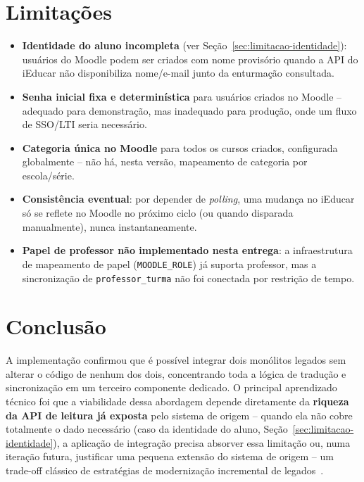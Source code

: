 \documentclass[
	12pt, openright, twoside, a4paper,
	english,
	brazil
	]{abntex2}
\begin{document}
\chapter{Limita\c{c}\~oes}
\label{cap:limitacoes}

\begin{itemize}
  \item \textbf{Identidade do aluno incompleta} (ver Se\c{c}\~ao~\ref{sec:limitacao-identidade}):
  usu\'arios do Moodle podem ser criados com nome provis\'orio quando a API do iEducar n\~ao
  disponibiliza nome/e-mail junto da enturma\c{c}\~ao consultada.
  \item \textbf{Senha inicial fixa e determin\'istica} para usu\'arios criados no Moodle -- adequado
  para demonstra\c{c}\~ao, mas inadequado para produ\c{c}\~ao, onde um fluxo de SSO/LTI seria
  necess\'ario.
  \item \textbf{Categoria \'unica no Moodle} para todos os cursos criados, configurada globalmente
  -- n\~ao h\'a, nesta vers\~ao, mapeamento de categoria por escola/s\'erie.
  \item \textbf{Consist\^encia eventual}: por depender de \emph{polling}, uma mudan\c{c}a no
  iEducar só se reflete no Moodle no pr\'oximo ciclo (ou quando disparada manualmente), nunca
  instantaneamente.
  \item \textbf{Papel de professor n\~ao implementado nesta entrega}: a infraestrutura de
  mapeamento de papel (\texttt{MOODLE\_ROLE}) j\'a suporta professor, mas a sincroniza\c{c}\~ao de
  \texttt{professor\_turma} n\~ao foi conectada por restri\c{c}\~ao de tempo.
\end{itemize}

\chapter*{Conclus\~ao}

A implementa\c{c}\~ao confirmou que \'e poss\'ivel integrar dois monólitos legados sem alterar o
c\'odigo de nenhum dos dois, concentrando toda a l\'ogica de tradu\c{c}\~ao e sincroniza\c{c}\~ao
em um terceiro componente dedicado. O principal aprendizado t\'ecnico foi que a viabilidade dessa
abordagem depende diretamente da \textbf{riqueza da API de leitura j\'a exposta} pelo sistema de
origem -- quando ela n\~ao cobre totalmente o dado necess\'ario (caso da identidade do aluno,
Se\c{c}\~ao~\ref{sec:limitacao-identidade}), a aplica\c{c}\~ao de integra\c{c}\~ao precisa absorver
essa limita\c{c}\~ao ou, numa itera\c{c}\~ao futura, justificar uma pequena extens\~ao do sistema de
origem -- um trade-off cl\'assico de estrat\'egias de moderniza\c{c}\~ao incremental de
legados~\cite{fowler-strangler}.
\end{document}
